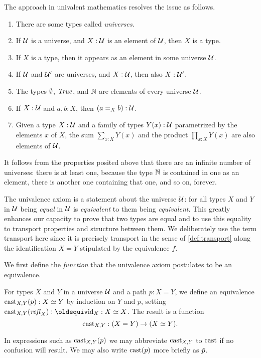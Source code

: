 The approach in univalent mathematics resolves the issue as follows.

\begin{enumerate}
\item There are some types called {\em universes}.
\item If $\mathcal{U}$ is a universe, and $X : \mathcal{U}$ is an element of $\mathcal{U}$, then $X$ is a type.
\item If $X$ is a type, then it appears as an element in some universe $\mathcal{U}$.
\item If $\mathcal{U}$ and $\mathcal{U}'$ are universes, and $X:\mathcal{U}$, then also $X:\mathcal{U}'$.
\item The types $\emptyset$, $\mathop{\mathit{True}}$, and $\mathbb{N}$ are elements of every universe $\mathcal{U}$.
\item If $X : \mathcal{U}$ and $a,b:X$, then $(a = _X b) : \mathcal{U}$.  
\item Given a type $X:\mathcal{U}$ and a family of types $Y(x):\mathcal{U}$ parametrized by the elements $x$ of $X$, the sum $\sum_{x:X} Y(x)$ and the product
  $\prod_{x:X} Y(x)$ are also elements of $\mathcal{U}$.
\end{enumerate}

It follows from the properties posited above that there are an infinite number of universes: there is at least one, because the type $\mathbb{N}$ is
contained in one as an element, there is another one containing that one, and so on, forever.

The univalence axiom is a statement about the universe $\mathcal{U}$: 
for all types $X$ and $Y$ in $\mathcal{U}$ being \emph{equal} in $\mathcal{U}$ is 
\emph{equivalent} to them being \emph{equivalent}. This greatly
enhances our capacity to prove that two types are equal
and to use this equality to transport properties and structure
between them. We deliberately use the term transport
here since it is precisely transport in the sense of
\cref{def:transport} along the identification
$X = Y$ stipulated by the equivalence $f$.

We first define the \emph{function} that
the univalence axiom postulates to be an equivalence.

\begin{definition}\label{def:idtoeq}
  For types $X$ and $Y$ in a universe $\mathcal{U}$ and a path $p : X = Y$, we define an equivalence $\mathrm{cast}_{X,Y} (p) : X\simeq Y$ by induction on $Y$ and $p$, setting
  $\cast_{X,Y} (\refl X) \defeq \id_X : X \equiv X$.  The result is a function \[ \mathrm{cast}_{X,Y} : (X = Y) \to (X\simeq Y). \]
\end{definition}
  
In expressions such as $\mathrm{cast}_{X,Y}(p)$ we may abbreviate $\mathrm{cast}_{X,Y}$ to $\mathrm{cast}$ if no confusion will result.
We may also write $\mathrm{cast} (p)$ more briefly as $\tilde {p}$.

